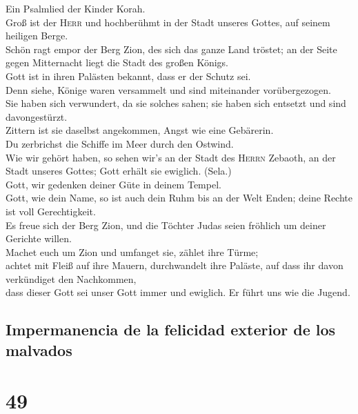  Ein Psalmlied der Kinder Korah.\\
 Groß ist der \textsc{Herr} und hochberühmt in der Stadt
unseres Gottes, auf seinem heiligen Berge.\\
 Schön ragt empor der Berg Zion, des sich das ganze Land
tröstet; an der Seite gegen Mitternacht liegt die Stadt des großen
Königs.\\
 Gott ist in ihren Palästen bekannt, dass er der Schutz
sei.\\
 Denn siehe, Könige waren versammelt und sind miteinander
vorübergezogen.\\
 Sie haben sich verwundert, da sie solches sahen; sie
haben sich entsetzt und sind davongestürzt.\\
 Zittern ist sie daselbst angekommen, Angst wie eine
Gebärerin.\\
 Du zerbrichst die Schiffe im Meer durch den Ostwind.\\
 Wie wir gehört haben, so sehen wir's an der Stadt des
\textsc{Herrn} Zebaoth, an der Stadt unseres Gottes; Gott erhält sie
ewiglich. (Sela.)\\
 Gott, wir gedenken deiner Güte in deinem Tempel.\\
 Gott, wie dein Name, so ist auch dein Ruhm bis an der
Welt Enden; deine Rechte ist voll Gerechtigkeit.\\
 Es freue sich der Berg Zion, und die Töchter Judas seien
fröhlich um deiner Gerichte willen.\\
 Machet euch um Zion und umfanget sie, zählet ihre
Türme;\\
 achtet mit Fleiß auf ihre Mauern, durchwandelt ihre
Paläste, auf dass ihr davon verkündiget den Nachkommen,\\
 dass dieser Gott sei unser Gott immer und ewiglich. Er
führt uns wie die Jugend.

\hypertarget{impermanencia-de-la-felicidad-exterior-de-los-malvados}{%
\subsection{Impermanencia de la felicidad exterior de los
malvados}\label{impermanencia-de-la-felicidad-exterior-de-los-malvados}}

\hypertarget{section-48}{%
\section{49}\label{section-48}}

